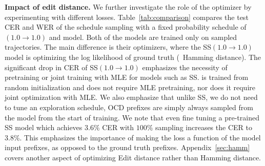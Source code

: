 {\bf Impact of edit distance.} We further investigate the role of the optimizer by experimenting with different losses. Table~\ref{tab:comparison} compares the test CER and WER of the schedule sampling with a fixed probability schedule of $(1.0 \rightarrow 1.0)$ and \acronym model. Both of the models are trained only on sampled trajectories. The main difference is their optimizers, where the SS$(1.0\rightarrow1.0)$ model is optimizing the log likelihood of ground truth (\aka~Hamming distance). The significant drop in CER of SS$(1.0\rightarrow1.0)$ emphasizes the necessity of pretraining or joint training with MLE for models such as SS. \acronym is trained from random initialization and does not require MLE pretraining, nor does it require joint optimization with MLE. We also emphasize that unlike SS, we do not need to tune an exploration schedule, OCD prefixes are simply always sampled from the model from the start of training. We note that even fine tuning a pre-trained SS model which achieves $3.6\%$ CER with $100\%$ sampling increases the CER to $3.8$\%. This emphasizes the importance of making the loss a function of the model input prefixes, as opposed to the ground truth prefixes. Appendix~\ref{sec:hamm} covers another aspect of optimizing Edit distance rather than Hamming distance.

